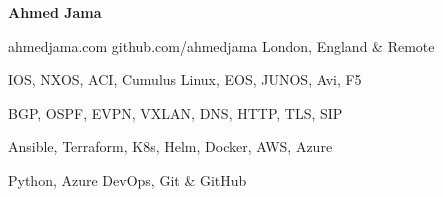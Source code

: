 \documentclass[11pt]{article} %
\begin{document}
\centerline{{\Huge \bf Ahmed Jama}}

\bigskip

        {ahmedjama.com}
        {github.com/ahmedjama}
        {London, England \& Remote}


      {IOS, NXOS, ACI, Cumulus Linux, EOS, JUNOS, Avi, F5}
      
      {BGP, OSPF, EVPN, VXLAN, DNS, HTTP, TLS, SIP}

      {Ansible, Terraform, K8s, Helm, Docker, AWS, Azure}

      {Python, Azure DevOps, Git \& GitHub}



\end{document}
